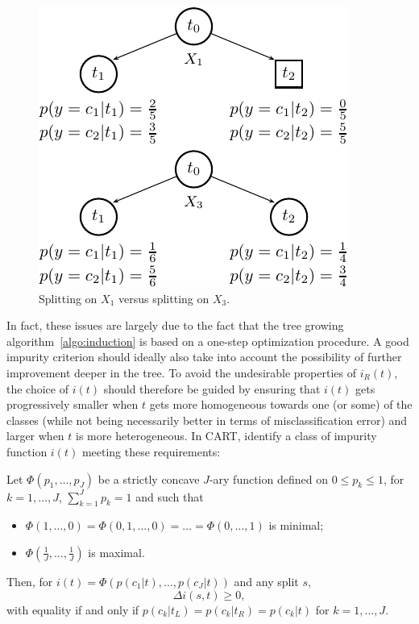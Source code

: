 \begin{figure}
    \centering
    \includegraphics[scale=1.0]{figures/ch3_goodness.pdf}
    \caption{Splitting on $X_1$ versus splitting on $X_3$.}
    \label{fig:3:goodness}
\end{figure}

In fact, these issues are largely due to the fact that the tree growing
algorithm~\ref{algo:induction} is based on a one-step optimization procedure. A
good impurity criterion should ideally also take into account the possibility
of further improvement deeper in the tree. To avoid the undesirable properties
of $i_R(t)$, the choice of $i(t)$ should therefore be
guided by ensuring that $i(t)$ gets progressively smaller when $t$ gets more
homogeneous towards one (or some) of the classes (while not being necessarily
better in terms of misclassification error) and larger when $t$ is more
heterogeneous. In CART, \citet{breiman:1984} identify a class of impurity
function $i(t)$ meeting these requirements:

\begin{theorem}\label{thm:reduction-impurity}
Let $\Phi(p_1, \dots, p_J)$ be a strictly concave $J$-ary function defined
on $0 \leq p_k \leq 1$, for $k=1,\dots,J$, $\sum_{k=1}^J p_k = 1$ and such that
\begin{itemize}
\item $\Phi(1, \dots, 0) = \Phi(0, 1, \dots, 0) = \dots = \Phi(0, \dots, 1)$ is minimal;
\item $\Phi(\frac{1}{J}, \dots, \frac{1}{J})$ is maximal.
\end{itemize}
Then, for $i(t) = \Phi(p(c_1|t), \dots, p(c_J|t))$ and any split $s$, $$\Delta i(s, t) \geq 0,$$
with equality if and only if $p(c_k|t_L)=p(c_k|t_R)=p(c_k|t)$ for $k=1,\dots,J$.
\end{theorem}

